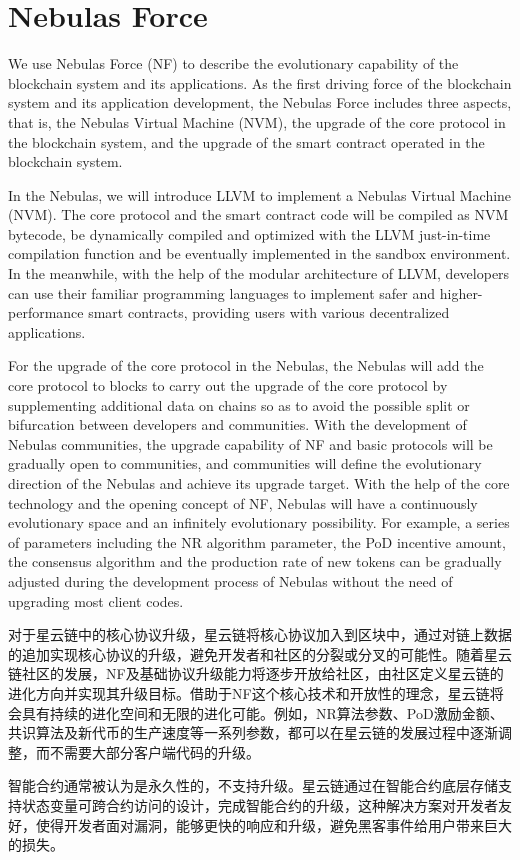 \section{Nebulas Force}
\label{sec:nebulasforce}

We use Nebulas Force (NF) to describe the evolutionary capability of the blockchain system and its applications. As the first driving force of the blockchain system and its application development, the Nebulas Force includes three aspects, that is, the Nebulas Virtual Machine (NVM), the upgrade of the core protocol in the blockchain system, and the upgrade of the smart contract operated in the blockchain system.

In the Nebulas, we will introduce LLVM to implement a Nebulas Virtual Machine (NVM). The core protocol and the smart contract code will be compiled as NVM bytecode, be dynamically compiled and optimized with the LLVM just-in-time compilation function and be eventually implemented in the sandbox environment. In the meanwhile, with the help of the modular architecture of LLVM, developers can use their familiar programming languages to implement safer and higher-performance smart contracts, providing users with various decentralized applications. 

For the upgrade of the core protocol in the Nebulas, the Nebulas will add the core protocol to blocks to carry out the upgrade of the core protocol by supplementing additional data on chains so as to avoid the possible split or bifurcation between developers and communities.  With the development of Nebulas communities, the upgrade capability of NF and basic protocols will be gradually open to communities, and communities will define the evolutionary direction of the Nebulas and achieve its upgrade target. With the help of the core technology and the opening concept of NF, Nebulas will have a continuously evolutionary space and an infinitely evolutionary possibility. For example, a series of parameters including the NR algorithm parameter, the PoD incentive amount, the consensus algorithm and the production rate of new tokens can be gradually adjusted during the development process of Nebulas without the need of upgrading most client codes.

对于星云链中的核心协议升级，星云链将核心协议加入到区块中，通过对链上数据的追加实现核心协议的升级，避免开发者和社区的分裂或分叉的可能性。随着星云链社区的发展，NF及基础协议升级能力将逐步开放给社区，由社区定义星云链的进化方向并实现其升级目标。借助于NF这个核心技术和开放性的理念，星云链将会具有持续的进化空间和无限的进化可能。例如，NR算法参数、PoD激励金额、共识算法及新代币的生产速度等一系列参数，都可以在星云链的发展过程中逐渐调整，而不需要大部分客户端代码的升级。

智能合约通常被认为是永久性的，不支持升级。星云链通过在智能合约底层存储支持状态变量可跨合约访问的设计，完成智能合约的升级，这种解决方案对开发者友好，使得开发者面对漏洞，能够更快的响应和升级，避免黑客事件给用户带来巨大的损失。




